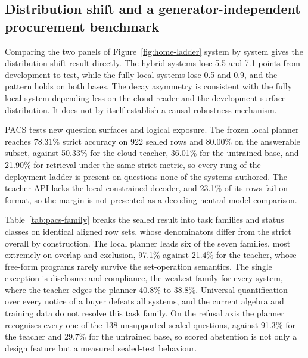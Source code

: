 \documentclass{article}
\begin{document}
\subsection{Distribution shift and a generator-independent procurement benchmark}
\label{sec:robustness}

Comparing the two panels of Figure~\ref{fig:home-ladder} system by
system gives the distribution-shift result directly. The hybrid systems
lose 5.5 and 7.1 points from development to test, while the fully local
systems lose 0.5 and 0.9, and the pattern holds on both bases. The decay asymmetry is consistent with the fully local system depending
less on the cloud reader and the development surface distribution. It does
not by itself establish a causal robustness mechanism.

PACS tests new question surfaces and logical exposure. The frozen local
planner reaches 78.31\% strict accuracy on 922 sealed rows and 80.00\% on
the answerable subset, against 50.33\% for the cloud teacher, 36.01\% for
the untrained base, and 21.90\% for retrieval under the same strict
metric, so every rung of the deployment ladder is present on questions
none of the systems authored. The teacher API lacks the local constrained
decoder, and 23.1\% of its rows fail on format, so the margin is not
presented as a decoding-neutral model comparison.

Table~\ref{tab:pacs-family} breaks the sealed result into task families
and status classes on identical aligned row sets, whose denominators
differ from the strict overall by construction. The local planner leads
six of the seven families, most extremely on overlap
and exclusion, 97.1\% against 21.4\% for the teacher, whose free-form
programs rarely survive the set-operation semantics. The single exception
is disclosure and compliance, the weakest family for every system, where
the teacher edges the planner 40.8\% to 38.8\%. Universal quantification
over every notice of a buyer defeats all systems, and the current algebra
and training data do not resolve this task family. On the refusal axis the planner recognises every one
of the 138 unsupported sealed questions, against 91.3\% for the teacher
and 29.7\% for the untrained base, so scored abstention is not only a
design feature but a measured sealed-test behaviour.
\end{document}
